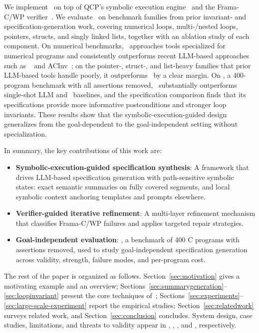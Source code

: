 We implement \toolname\ on top of QCP's symbolic execution engine~\cite{vst-a,wu2025qcppracticalseparationlogicbased} and the Frama-C/WP verifier~\cite{cuoq2012frama}.
We evaluate \toolname\ on benchmark families from prior invariant- and specification-generation work, covering numerical loops, multi-/nested loops, pointers, structs, and singly linked lists, together with an ablation study of each component. On numerical benchmarks, \toolname\ approaches tools specialized for numerical programs and consistently outperforms recent LLM-based approaches such as \autospec~\cite{autospec} and ACInv~\cite{Enhancing_Automated_Loop_Invariant_Generation_for_Complex_Programs_with_Large_Language_Models}; on the pointer-, struct-, and list-heavy families that prior LLM-based tools handle poorly, it outperforms \autospec\ by a clear margin. On \textbf{}, a 400-program benchmark with all assertions removed, \toolname\ substantially outperforms single-shot LLM and \autospec\ baselines, and the specification
comparison finds that its specifications provide more informative postconditions and stronger loop invariants. These results show that the symbolic-execution-guided design generalizes from the goal-dependent to the goal-independent setting without specialization.

In summary, the key contributions of this work are:
\begin{itemize}
\item \textbf{Symbolic-execution-guided specification synthesis}: 
A framework that drives LLM-based specification generation with path-sensitive symbolic states: exact semantic summaries on fully covered segments, and local symbolic context anchoring templates and prompts elsewhere.
\item \textbf{Verifier-guided iterative refinement}: A multi-layer refinement mechanism that classifies Frama-C/WP failures and applies targeted repair strategies.
\item \textbf{Goal-independent evaluation}: \textbf{}, a benchmark of 400 C programs with assertions removed, used to study goal-independent specification generation across validity, strength, failure modes, and per-program cost.
\end{itemize}

The rest of the paper is organized as follows. Section~\ref{sec:motivation} gives a motivating example and an overview; Sections~\ref{sec:summarygeneration}--\ref{sec:loopinvariant} present the core techniques of\ \toolname; Sections~\ref{sec:experiments}--\ref{sec:large-scale-experiment} report the empirical studies; Section~\ref{sec:relatedwork} surveys related work, and Section~\ref{sec:conclusion} concludes. System design, case studies, limitations, and threats to validity appear in {}, {}, {}, and {}, respectively.
